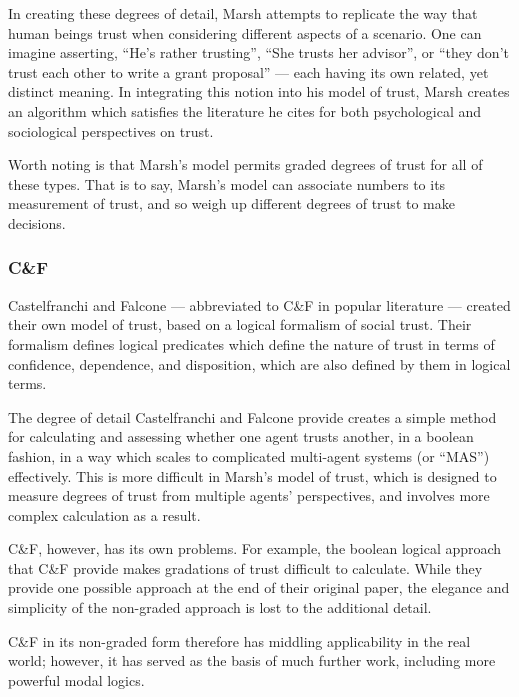 In creating these degrees of detail, Marsh attempts to replicate the way that human beings trust when considering different aspects of a scenario. One can imagine asserting, ``He's rather trusting'', ``She trusts her advisor'', or ``they don't trust each other to write a grant proposal'' --- each having its own related, yet distinct meaning. In integrating this notion into his model of trust, Marsh creates an algorithm which satisfies the literature he cites for both psychological and sociological perspectives on trust.\par

Worth noting is that Marsh's model permits graded degrees of trust for all of these types. That is to say, Marsh's model can associate numbers to its measurement of trust, and so weigh up different degrees of trust to make decisions.\par

\subsubsection*{C\&F}\label{sec:cnf}
Castelfranchi and Falcone\cite{Castelfranchi2001} --- abbreviated to C\&F in popular literature --- created their own model of trust, based on a logical formalism of social trust. Their formalism defines logical predicates which define the nature of trust in terms of confidence, dependence, and disposition, which are also defined by them in logical terms.\par

The degree of detail Castelfranchi and Falcone provide creates a simple method for calculating and assessing whether one agent trusts another, in a boolean fashion, in a way which scales to complicated multi-agent systems (or ``MAS'') effectively. This is more difficult in Marsh's model of trust, which is designed to measure degrees of trust from multiple agents' perspectives, and involves more complex calculation as a result.\par

C\&F, however, has its own problems. For example, the boolean logical approach that C\&F provide makes gradations of trust difficult to calculate. While they provide one possible approach at the end of their original paper, the elegance and simplicity of the non-graded approach is lost to the additional detail.\par

C\&F in its non-graded form therefore has middling applicability in the real world; however, it has served as the basis of much further work\cite{Herzig2009}, including more powerful modal logics.\cite{Kramdi}\par

